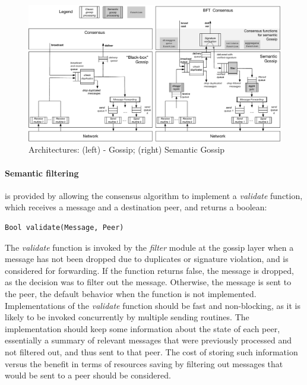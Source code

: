 \begin{figure}[htbp]
    \centering
    \includegraphics[width=1\columnwidth]{figures/architecture_SG3.pdf}

    
    \caption{Architectures: (left) - Gossip;  (right) Semantic Gossip}
    \label{fig:architecture}
    \label{fig:architecture_sg}
\vspace{-2mm}
\end{figure}


\paragraph{Semantic filtering} is provided by allowing the consensus algorithm to implement
a {\em validate} function, which receives a message and a destination peer, and
returns a boolean:

\begin{verbatim}
Bool validate(Message, Peer)
\end{verbatim}
The {\em validate} function is invoked by the {\em filter} module at the gossip layer when a message has not been dropped due to duplicates or signature violation, and is considered for forwarding.
%
If the function returns false, the message is dropped, as the decision was to
filter out the message.
Otherwise, the message is sent to the peer, the default behavior when the
function is not implemented.
%
Implementations of the {\em validate} function should be fast and non-blocking,
as it is likely to be invoked concurrently by multiple sending routines.
The implementation should keep some information about the state of each peer,
essentially a summary of relevant messages that were previously processed and
not filtered out, and thus sent to that peer.
The cost of storing such information versus the benefit in terms of resources
saving by filtering out messages that would be sent to a peer
should be considered.


